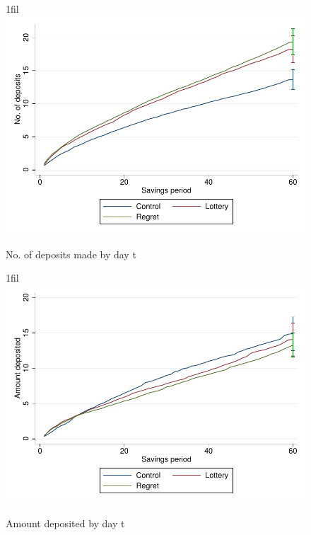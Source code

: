 \documentclass[11pt]{article}
\makeatletter
\newcommand*{\centerfloat}{\parindent \z@ \leftskip \z@ \@plus 1fil \@minus \textwidth \rightskip \leftskip \parfillskip \z@skip}
\makeatother
\begin{document}
	
	
	
	
	
	

	\clearpage

	\begin{figure}[!htb]
		\centering
		\caption{No. of deposits made by day t}
		\centerfloat
		\includegraphics{../../figures/line-cumdeposits.pdf}
		\label{fig:line-cumdeposits}
	\end{figure}

	\begin{figure}[!htb]
		\centering
		\caption{Amount deposited by day t}
		\centerfloat
		\includegraphics{../../figures/line-cumdepositamount.pdf}
		\label{fig:line-cumdepositamount}
	\end{figure}
\end{document}

